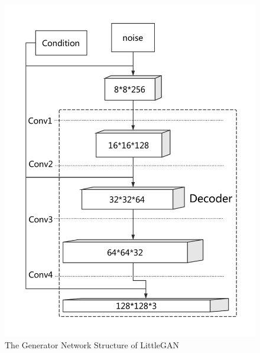 \begin{figure}
    \begin{minipage}[t]{0.48\linewidth}
        \centering
        \includegraphics[width=\textwidth]{figures/net_generator.pdf}
        \caption{The Generator Network Structure of LittleGAN}
        \label{net_generator}
    \end{minipage}
        \hfill
    \begin{minipage}[t]{0.48\linewidth}
        \centering

\end{minipage}
\end{figure}
